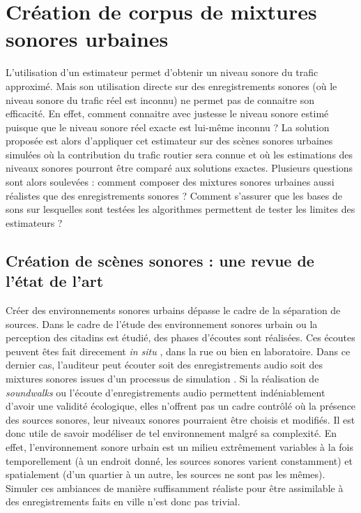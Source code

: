 %
%
%	
%
%
%

\chapter{Création de corpus de mixtures sonores urbaines}
\label{chap:corpusSonore}

L'utilisation d'un estimateur permet d'obtenir un niveau sonore du trafic approximé. Mais son utilisation directe sur des enregistrements sonores (où le niveau sonore du trafic réel est inconnu) ne permet pas de connaitre son efficacité. En effet, comment connaitre avec justesse le niveau sonore estimé puisque que le niveau sonore réel exacte est lui-même inconnu ? La solution proposée est alors d'appliquer cet estimateur sur des scènes sonores urbaines simulées où la contribution du trafic routier sera connue et où les estimations des niveaux sonores pourront être comparé aux solutions exactes. Plusieurs questions sont alors soulevées : comment composer des mixtures sonores urbaines aussi réalistes que des enregistrements sonores ? Comment s'assurer que les bases de sons sur lesquelles sont testées les algorithmes permettent de tester les limites des estimateurs ? \\

\section{Création de scènes sonores : une revue de l'état de l'art}

Créer des environnements sonores urbains dépasse le cadre de la séparation de sources. 
Dans le cadre de l'étude des environnement sonores urbain ou la perception des citadins est étudié, des phases d'écoutes sont réalisées. Ces écoutes peuvent êtes fait direcement \textit{in situ} \cite{adams_soundwalking_2008} \cite{raimbault2003ambient}, dans la rue ou bien en laboratoire. Dans ce dernier cas, l'auditeur peut écouter soit des enregistrements audio \cite{guastavino2005ecological} soit des mixtures sonores issues d'un processus de simulation \cite{lafay_new_2014}. Si la réalisation de \textit{soundwalks} ou l'écoute d'enregistrements audio permettent indéniablement d'avoir une validité écologique, elles n'offrent pas un cadre contrôlé où la présence des sources sonores, leur niveaux sonores pourraient être choisis et modifiés. Il est donc utile de savoir modéliser de tel environnement malgré sa complexité. En effet, l'environnement sonore urbain est un milieu extrêmement variables à la fois temporellement (à un endroit donné, les sources sonores varient constamment) et spatialement (d'un quartier à un autre, les sources ne sont pas les mêmes). Simuler ces ambiances de manière suffisamment réaliste pour être assimilable à des enregistrements faits en ville n'est donc pas trivial. 



